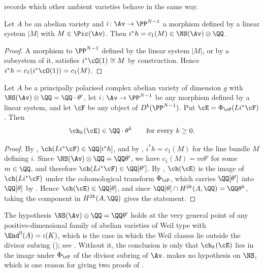 \cite[Remark~2.3]{paperIII} records which other ambient varieties behave in the
same way.

\begin{lemma}\label{lem:hyperclass}
Let $A$ be an abelian variety and $i\colon\Av\to\PP^{N-1}$ a morphism defined
by a linear system $|M|$ with $M\in\Pic(\Av)$. Then
$i^{*}h=c_{1}(M)\in\NS(\Av)\otimes\QQ$.
\end{lemma}

\begin{proof}
A morphism to $\PP^{N-1}$ defined by the linear system $|M|$, or by a
subsystem of it, satisfies $i^{*}\cO(1)\cong M$ by construction. Hence
$i^{*}h=c_{1}(i^{*}\cO(1))=c_{1}(M)$.
\end{proof}

\begin{theorem}\label{thm:divisor}
Let $A$ be a principally polarised complex abelian variety of dimension $g$
with $\NS(\Av)\otimes\QQ=\QQ\cdot\theta'$, let $i\colon\Av\to\PP^{N-1}$ be any
morphism defined by a linear system, and let $\cF$ be any object of
$D^{b}(\PP^{N-1})$. Put $\cE=\Phi_{\cP}(Li^{*}\cF)$. Then
\[
  \ch_{k}(\cE)\in\QQ\cdot\theta^{k}\qquad\text{for every }k\ge0 .
\]
\end{theorem}

\begin{proof}
By , $\ch(Li^{*}\cF)\in\QQ[i^{*}h]$, and by
, $i^{*}h=c_{1}(M)$ for the line bundle $M$ defining $i$.
Since $\NS(\Av)\otimes\QQ=\QQ\theta'$, we have $c_{1}(M)=m\theta'$ for some
$m\in\QQ$, and therefore $\ch(Li^{*}\cF)\in\QQ[\theta']$. By
, $\ch(\cE)$ is the image of $\ch(Li^{*}\cF)$ under the
cohomological transform $\Phi_{\cP}$, which carries $\QQ[\theta']$ into
$\QQ[\theta]$ by . Hence $\ch(\cE)\in\QQ[\theta]$, and
since $\QQ[\theta]\cap H^{2k}(A,\QQ)=\QQ\theta^{k}$, taking the component in
$H^{2k}(A,\QQ)$ gives the statement.
\end{proof}

\begin{remark}\label{rem:NShyp}
The hypothesis $\NS(\Av)\otimes\QQ=\QQ\theta'$ holds at the very general point
of any positive-dimensional family of abelian varieties of Weil type with
$\End^{0}(A)=\iota(K)$, which is the case in which the Weil classes lie
outside the divisor subring (); see .
Without it, the conclusion is only that $\ch_{k}(\cE)$ lies in the image
under $\Phi_{\cP}$ of the divisor subring of $\Av$. 
makes no hypothesis on $\NS$, which is one reason for giving two proofs of
.
\end{remark}

